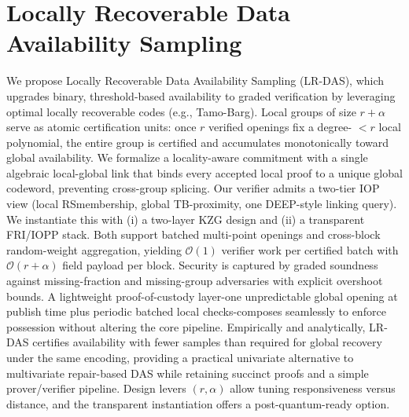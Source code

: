 \documentclass[11pt,oneside]{book}
\theoremstyle{definition}
\theoremstyle{remark}
\theoremstyle{plain}
\begin{document}
\section{\cite{cryptoeprint:2025/1851} Locally Recoverable Data Availability Sampling}
We propose Locally Recoverable Data Availability Sampling (LR-DAS), which upgrades binary, threshold-based availability to graded verification by leveraging optimal locally recoverable codes (e.g., Tamo-Barg). Local groups of size $r+\alpha$ serve as atomic certification units: once $r$ verified openings fix a degree- $<r$ local polynomial, the entire group is certified and accumulates monotonically toward global availability. We formalize a locality-aware commitment with a single algebraic local-global link that binds every accepted local proof to a unique global codeword, preventing cross-group splicing. Our verifier admits a two-tier IOP view (local RSmembership, global TB-proximity, one DEEP-style linking query). We instantiate this with (i) a two-layer KZG design and (ii) a transparent FRI/IOPP stack. Both support batched multi-point openings and cross-block random-weight aggregation, yielding $\mathcal{O}(1)$ verifier work per certified batch with $\mathcal{O}(r+\alpha)$ field payload per block. Security is captured by graded soundness against missing-fraction and missing-group adversaries with explicit overshoot bounds. A lightweight proof-of-custody layer-one unpredictable global opening at publish time plus periodic batched local checks-composes seamlessly to enforce possession without altering the core pipeline. Empirically and analytically, LR-DAS certifies availability with fewer samples than required for global recovery under the same encoding, providing a practical univariate alternative to multivariate repair-based DAS while retaining succinct proofs and a simple prover/verifier pipeline. Design levers $(r, \alpha)$ allow tuning responsiveness versus distance, and the transparent instantiation offers a post-quantum-ready option.
\end{document}
